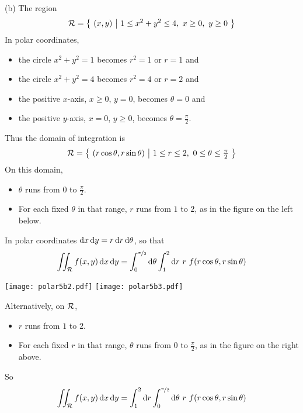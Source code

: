 \begin{solution}
(b) The region 
\begin{equation*}
\mathcal{R}=\big\{ \ (x,y)\ \big|\ 1\le x^2+y^2\le 4,\ x\ge 0,\ y\ge 0\ \big\}
\end{equation*}
In polar coordinates, 
\begin{itemize}
\item
the circle $x^2+y^2=1$ becomes $r^2=1$ or $r=1$ and 
\item
the circle $x^2+y^2=4$ becomes $r^2=4$ or $r=2$ and 
\item
the positive $x$-axis, $x\ge0$, $y=0$,  becomes $\theta=0$ and
\item
the positive $y$-axis, $x=0$, $y\ge0$,  becomes $\theta=\frac{\pi}{2}$. 
\end{itemize}
Thus the domain of integration is
\begin{equation*}
\cR=\Set{(r\cos\theta,r\sin\theta)}{1\le r\le 2,\ 0\le\theta\le\tfrac{\pi}{2}}
\end{equation*}
On this domain,
\begin{itemize}
\item 
$\theta$ runs from $0$ to $\frac{\pi}{2}$. 
\item
For each fixed $\theta$ in that range, $r$ runs from $1$ to $2$, 
as in the figure on the left below.
\end{itemize}
In polar coordinates $\mathrm{d}x\,\mathrm{d}y = r\,\mathrm{d}r\,\mathrm{d}\theta$, so that
\begin{equation*}
\iint_{\mathcal{R}} f(x,y)\,\mathrm{d}x\,\mathrm{d}y
=\int_0^{\nicefrac{\pi}{2}}\mathrm{d}\theta
 \int_1^2\mathrm{d}r\ r\ f(r\cos\theta,r\sin\theta)
\end{equation*}
\begin{center}
     \texttt{[image: polar5b2.pdf]}\qquad\qquad
     \texttt{[image: polar5b3.pdf]}
\end{center}
Alternatively, on $\mathcal{R}$,
\begin{itemize}
\item 
$r$ runs from $1$ to $2$. 
\item
For each fixed $r$ in that range, $\theta$ runs from $0$ to $\frac{\pi}{2}$,
as in the figure on the right above.
\end{itemize}
So 
\begin{equation*}
\iint_{\mathcal{R}} f(x,y)\,\mathrm{d}x\,\mathrm{d}y
=\int_1^2\mathrm{d}r
  \int_0^{\nicefrac{\pi}{2}}\mathrm{d}\theta
 \ r\ f(r\cos\theta,r\sin\theta)
\end{equation*}


\end{solution}
